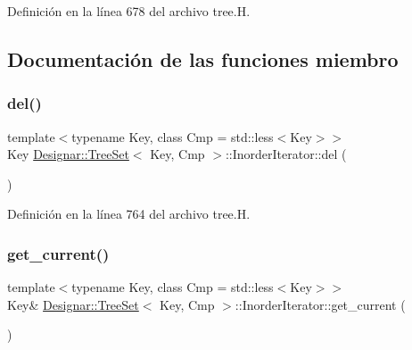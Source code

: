 Definición en la línea 678 del archivo tree.\+H.



\subsection{Documentación de las funciones miembro}
\mbox{\label{class_designar_1_1_tree_set_1_1_inorder_iterator_a137c29da7611999490f4a10a898b3c1d}} 
\subsubsection{\texorpdfstring{del()}{del()}}
{\footnotesize\ttfamily template$<$typename Key, class Cmp = std\+::less$<$\+Key$>$$>$ \\
Key \hyperlink{class_designar_1_1_tree_set}{Designar\+::\+Tree\+Set}$<$ Key, Cmp $>$\+::Inorder\+Iterator\+::del (\begin{DoxyParamCaption}{ }\end{DoxyParamCaption})\hspace{0.3cm}{\ttfamily [inline]}}



Definición en la línea 764 del archivo tree.\+H.

\mbox{\label{class_designar_1_1_tree_set_1_1_inorder_iterator_a48d0738cf18aa20c4a6161841324443d}} 
\subsubsection{\texorpdfstring{get\+\_\+current()}{get\_current()}\hspace{0.1cm}{\footnotesize\ttfamily [1/2]}}
{\footnotesize\ttfamily template$<$typename Key, class Cmp = std\+::less$<$\+Key$>$$>$ \\
Key\& \hyperlink{class_designar_1_1_tree_set}{Designar\+::\+Tree\+Set}$<$ Key, Cmp $>$\+::Inorder\+Iterator\+::get\+\_\+current (\begin{DoxyParamCaption}{ }\end{DoxyParamCaption})\hspace{0.3cm}{\ttfamily [inline]}}



